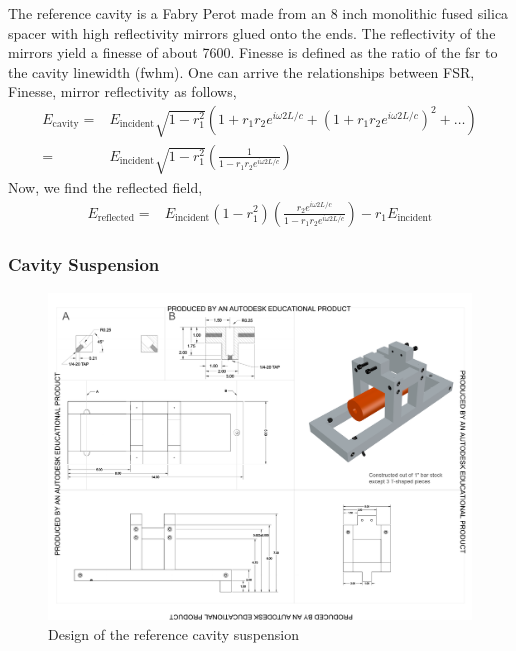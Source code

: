 The reference cavity is a Fabry Perot made from an 8 inch monolithic fused silica
spacer with high reflectivity mirrors glued onto the ends. The reflectivity
of the mirrors yield a finesse of about 7600. Finesse is defined as the ratio
of the \ac{fsr} to the cavity linewidth (\ac{fwhm}). One can arrive the
relationships between FSR, Finesse, mirror reflectivity as follows,
\begin{align}
E_{\mathrm{cavity}} =& E_{\mathrm{incident}} \sqrt{1-r_1^2} \left( 1 + r_1 r_2
    e^{i \omega 2 L /c} + \left(1+r_1 r_2 e^{i \omega 2L/c} \right)^2 + \ldots \right)
    \\
=& E_{\mathrm{incident}} \sqrt{1-r_1^2} \left( \frac{1}{1 - r_1 r_2
    e^{i \omega 2L/c}} \right)
\end{align}
Now, we find the reflected field,
\begin{align}
E_{\mathrm{reflected}} =& E_{\mathrm{incident}} \left( 1-r_1^2 \right)
    \left( \frac{r_2 e^{i \omega 2L/c}}{1 - r_1 r_2 e^{i \omega 2L/c}} \right)
    - r_1 E_{\mathrm{incident}}
\end{align}

\subsubsection{Cavity Suspension}
\begin{figure}[htbp]
	\centering
		\includegraphics[width=15cm]{./figures/refcavsusdesign.pdf}
	\caption[Reference Cavity Suspension Design]{Design of the reference cavity suspension}
	\label{fig:refcav_sus}
\end{figure}


